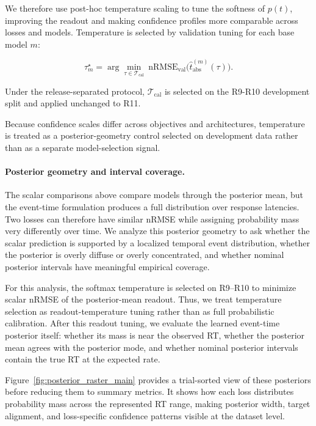 \documentclass[12pt]{article}
\begin{document}
We therefore use post-hoc temperature scaling \citep{guo2017calibration} to tune the softness of $p(t)$, improving the
readout and making confidence profiles more comparable across losses and models.
Temperature is selected by validation tuning for each base model $m$:

\begin{equation}
\label{eq:rt_tau_tuning}
\tau_m^\star = \arg\min_{\tau\in\mathcal{T}_{\text{cal}}}
\ \mathrm{nRMSE}_{\text{val}}\big(\hat t_{\mathrm{abs}}^{(m)}(\tau)\big).
\end{equation}

Under the release-separated protocol, $\mathcal{T}_{\text{cal}}$ is selected on the R9-R10 development split and applied unchanged to R11.

Because confidence scales differ across objectives and architectures, temperature is treated as a posterior-geometry
control selected on development data rather than as a separate model-selection signal.

\paragraph{Posterior geometry and interval coverage.}
The scalar comparisons above compare models through the posterior mean, but the event-time formulation produces a full distribution over response latencies. Two losses can therefore have similar nRMSE while assigning probability mass very differently over time. We analyze this posterior geometry to ask whether the scalar prediction is supported by a localized temporal event distribution, whether the posterior is overly diffuse or overly concentrated, and whether nominal posterior intervals have meaningful empirical coverage.

For this analysis, the softmax temperature is selected on R9--R10 to minimize scalar nRMSE of the posterior-mean readout. Thus, we treat temperature selection as readout-temperature tuning rather than as full probabilistic calibration. After this readout tuning, we evaluate the learned event-time posterior itself: whether its mass is near the observed RT, whether the posterior mean agrees with the posterior mode, and whether nominal posterior intervals contain the true RT at the expected rate.

Figure~\ref{fig:posterior_raster_main} provides a trial-sorted view of these posteriors before reducing them to summary metrics. It shows how each loss distributes probability mass across the represented RT range, making posterior width, target alignment, and loss-specific confidence patterns visible at the dataset level.
\end{document}
